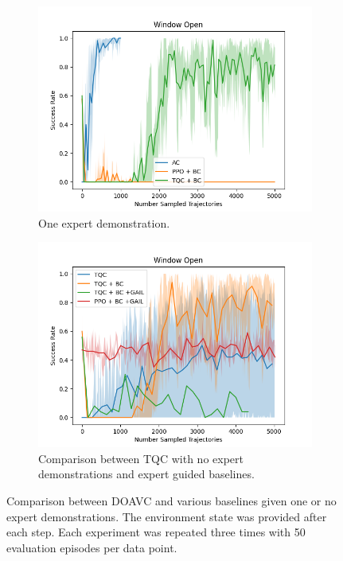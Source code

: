 \begin{figure}[htbp]
\begin{subfigure}[t]{0.45\textwidth}
    \includegraphics[width=\textwidth]{images/dense_1/Window Open.png}
    \caption{One expert demonstration.}
  \end{subfigure}
  \hfill
  \begin{subfigure}[t]{0.45\textwidth}
    \includegraphics[width=\textwidth]{images/TQC_bc_GAIL_vs_ref/Window Open.png}
    \caption{Comparison between TQC with no expert demonstrations and expert guided baselines.}
    \label{fig:TQC_0_vs_exp}
  \end{subfigure}
  \caption{Comparison between DOAVC and various baselines given one or no expert demonstrations. The environment state was provided after each step.
  Each experiment was repeated three times with 50 evaluation episodes per data point.}
  \label{fig:dense_ref}
\end{figure}

